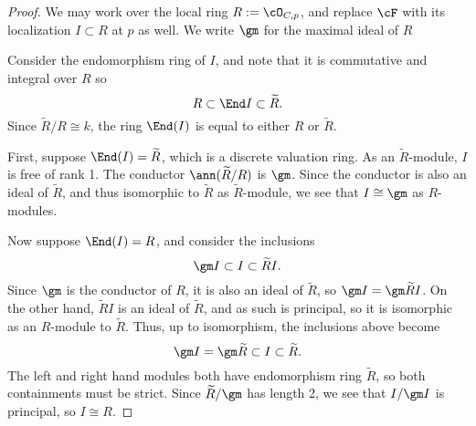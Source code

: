\begin{proof} We may work over the local ring $R := \cO_{C,p}$, and replace $\cF$ with 
its localization $I\subset R$ at $p$ as well. We write
$\gm$ for the maximal ideal of $R$

Consider the endomorphism ring of $I$, and note that it is commutative and integral over $R$ so 
$$
R \subset \End I \subset \widetilde R.
$$
Since
$\widetilde R/R \cong k$, the ring $\End(I)$ is equal to either 
$R$ or $\widetilde R$. 

First, suppose
$\End(I)=\widetilde R$, which is a discrete valuation ring.
 As an 
$\widetilde R$-module, $I$ is free of rank 1.  The conductor
$\ann(\widetilde R/R)$ is $\gm$.
Since the conductor is also an ideal of $\widetilde R$, and thus isomorphic to $\widetilde R$
as $\widetilde R$-module,
we see that $I \cong \gm$ as $R$-modules.

Now suppose
$\End(I)=R$, and consider the inclusions
$$
\gm I \subset I \subset \widetilde R I.
$$
Since $\gm$ is the conductor of $R$, it is also an ideal of $\widetilde R$, so
$\gm I = \gm \widetilde R I$. On the other hand, $\widetilde R I$ is an ideal of $\widetilde R$,
and as such is principal, so it is isomorphic as an $R$-module to $\widetilde R$. Thus, up to 
isomorphism, the inclusions above become
$$
\gm I = \gm \widetilde R \subset I \subset \widetilde R.
$$
The left and right hand modules both have endomorphism ring $\widetilde R$,
so both containments must be strict. Since $\widetilde R/\gm$ has length 2,
we see that $I/\gm I$ is principal, so $I\cong R$.
\end{proof}


%


